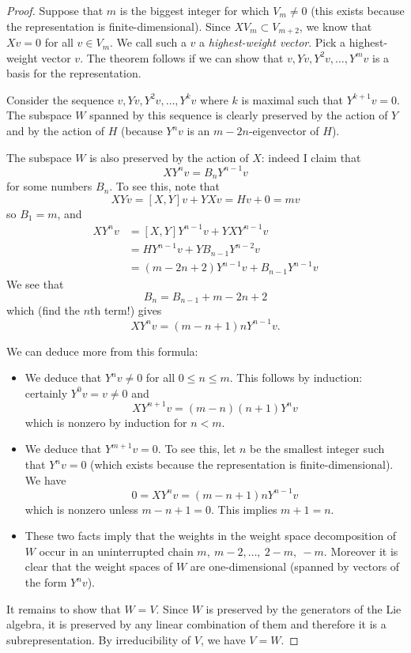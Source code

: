 \documentclass[12pt]{article}
\theoremstyle{definition}
\theoremstyle{check}
\theoremstyle{remark}
\theoremstyle{TheoremNum}
\begin{document}
\begin{proof}
Suppose that $m$ is the biggest integer for which $V_m\neq 0$ (this exists because the representation is finite-dimensional). Since $XV_m\subset V_{m+2}$, we know that $Xv=0$ for all $v\in V_m$. We call such a $v$ a {\em highest-weight vector}. Pick a highest-weight vector $v$. The theorem follows if we can show that $v,Yv,Y^2v,\ldots,Y^mv$ is a basis for the representation.

Consider the sequence $v,Yv,Y^2v,\ldots,Y^kv$ where $k$ is maximal such that $Y^{k+1}v=0$. The subspace $W$ spanned by this sequence is clearly preserved by the action of $Y$ and by the action of $H$ (because $Y^nv$ is an $m-2n$-eigenvector of $H$).

The subspace $W$ is also preserved by the action of $X$: indeed I claim that
\[XY^nv=B_nY^{n-1}v\]
for some numbers $B_n$. To see this, note that
\[XYv=[X,Y]v+YXv=Hv+0=mv\]
so $B_1=m$, and
\begin{align*}
XY^nv&=[X,Y]Y^{n-1}v+YXY^{n-1}v\\
&=HY^{n-1}v+YB_{n-1}Y^{n-2}v\\
&=(m-2n+2)Y^{n-1}v+B_{n-1}Y^{n-1}v
\end{align*}
We see that
\[B_n=B_{n-1}+m-2n+2\]
which (find the $n$th term!) gives
\[XY^nv=(m-n+1)nY^{n-1}v.\]

We can deduce more from this formula:
\begin{itemize}
\item We deduce that $Y^nv\neq 0$ for all $0\leq n\leq m$. This follows by induction: certainly $Y^0v=v\neq 0$ and
\[XY^{n+1}v=(m-n)(n+1)Y^nv\]
which is nonzero by induction for $n<m$.
\item We deduce that $Y^{m+1}v=0$. To see this, let $n$ be the smallest integer such that $Y^nv=0$ (which exists because the representation is finite-dimensional). We have
\[0=XY^nv=(m-n+1)nY^{n-1}v\]
which is nonzero unless $m-n+1=0$. This implies $m+1=n$.
\item These two facts imply that the weights in the weight space decomposition of $W$ occur in an uninterrupted chain $m,\ m-2,\ldots,\ 2-m,\ -m$. Moreover it is clear that the weight spaces of $W$ are one-dimensional (spanned by vectors of the form $Y^nv$).
\end{itemize}

It remains to show that $W=V$. Since $W$ is preserved by the generators of the Lie algebra, it is preserved by any linear combination of them and therefore it is a subrepresentation. By irreducibility of $V$, we have $V=W$.
\end{proof}
\end{document}

